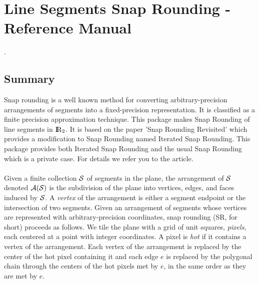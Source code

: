 
\chapter{Line Segments Snap Rounding - Reference Manual}
\label{chapterSnapRoundibgRef}
\ccChapterRelease\snapRoundingRev. \ \snapRoundingDate\\


\section*{Summary}

Snap rounding is a well known method for converting
arbitrary-precision arrangements of segments into a fixed-precision
representation. It is classified as a finite precision approximation 
technique. This package makes Snap Rounding of line segments in $\reals_2$.
It is based on the paper 'Snap Rounding Revisited' which provides a modification
to Snap Rounding named Iterated Snap Rounding. This package provides both
Iterated Snap Rounding and the usual Snap Rounding which is a private case.
For details we refer you to the article.\\ \\

Given a finite collection $\S$ of segments in the plane, the
arrangement of $\S$ denoted $\A(\S)$ is the subdivision of the plane
into vertices, edges, and faces induced by $\S$. %
A {\it vertex\/} of the arrangement is either a segment endpoint or
the intersection of two segments. Given an arrangement of segments
whose vertices are represented with arbitrary-precision coordinates,
snap rounding (SR, for short) proceeds as follows.  We tile the plane
with a grid of unit squares, {\it pixels}, each centered at a point
with integer coordinates. A pixel is {\it hot\/} if it contains a
vertex of the arrangement. Each vertex of the arrangement is replaced
by the center of the hot pixel containing it and each edge $e$ is
replaced by the polygonal chain through the centers of the hot pixels
met by $e$, in the same order as they are met by $e$.

